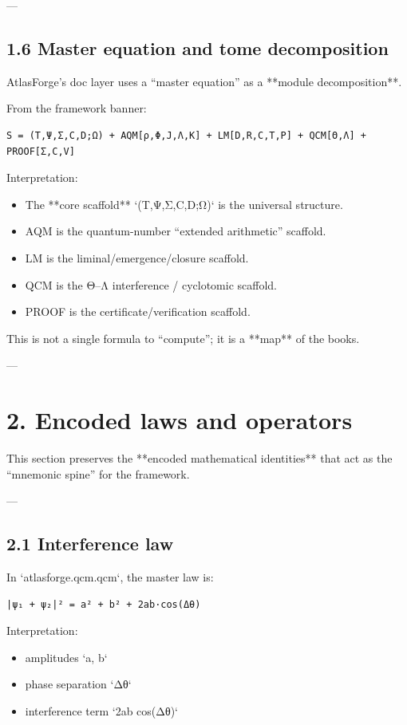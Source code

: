 \documentclass[11pt]{article}
\begin{document}
---

\subsection{1.6 Master equation and tome decomposition}

AtlasForge’s doc layer uses a “master equation” as a **module decomposition**.

From the framework banner:

\begin{lstlisting}
S = (T,Ψ,Σ,C,D;Ω) + AQM[ρ,Φ,J,Λ,K] + LM[D,R,C,T,P] + QCM[Θ,Λ] + PROOF[Σ,C,V]
\end{lstlisting}

Interpretation:
\begin{itemize}
\item The **core scaffold** `(T,Ψ,Σ,C,D;Ω)` is the universal structure.
\item AQM is the quantum-number “extended arithmetic” scaffold.
\item LM is the liminal/emergence/closure scaffold.
\item QCM is the Θ–Λ interference / cyclotomic scaffold.
\item PROOF is the certificate/verification scaffold.
\end{itemize}

This is not a single formula to “compute”; it is a **map** of the books.

---

\section{2. Encoded laws and operators}

This section preserves the **encoded mathematical identities** that act as the “mnemonic spine” for the framework.

---

\subsection{2.1 Interference law}

In `atlasforge.qcm.qcm`, the master law is:

\begin{lstlisting}
|ψ₁ + ψ₂|² = a² + b² + 2ab·cos(Δθ)
\end{lstlisting}

Interpretation:
\begin{itemize}
\item amplitudes `a, b`
\item phase separation `Δθ`
\item interference term `2ab cos(Δθ)`
\end{itemize}
\end{document}
